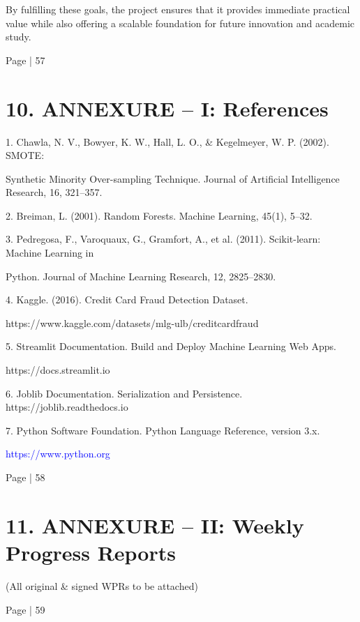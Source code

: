 \documentclass[11pt,a4paper]{article}
\begin{document}
By fulfilling these goals, the project ensures that it provides immediate practical value while also 
offering a scalable foundation for future innovation and academic study. 

Page | 57  

\newpage

\section*{10. ANNEXURE – I:  References }

1. Chawla, N. V., Bowyer, K. W., Hall, L. O., \& Kegelmeyer, W. P. (2002). SMOTE: 

Synthetic Minority Over-sampling Technique. Journal of Artificial Intelligence Research, 16, 
321–357. 

2. Breiman, L. (2001). Random Forests. Machine Learning, 45(1), 5–32. 

3. Pedregosa, F., Varoquaux, G., Gramfort, A., et al. (2011). Scikit-learn: Machine Learning in 

Python. Journal of Machine Learning Research, 12, 2825–2830. 

4. Kaggle. (2016). Credit Card Fraud Detection Dataset. 

https://www.kaggle.com/datasets/mlg-ulb/creditcardfraud 

5. Streamlit Documentation. Build and Deploy Machine Learning Web Apps. 

https://docs.streamlit.io 

6. Joblib Documentation. Serialization and Persistence. https://joblib.readthedocs.io 

7. Python Software Foundation. Python Language Reference, version 3.x. 

\textcolor{blue}{https://www.python.org }

Page | 58  

\newpage

\section*{11. ANNEXURE – II:  Weekly Progress Reports  }

\begin{center}
{\large (All original \& signed WPRs to be attached) }
\end{center}

Page | 59  
\end{document}
